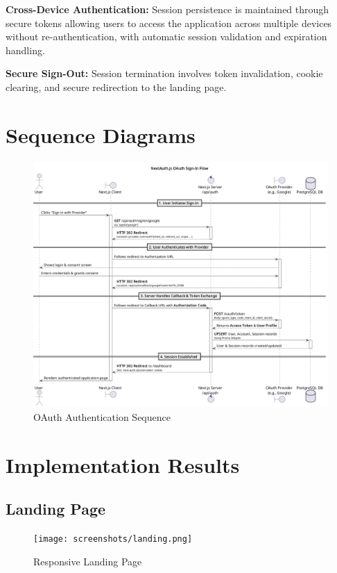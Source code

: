 \textbf{Cross-Device Authentication:}
Session persistence is maintained through secure tokens allowing users to access the application across multiple devices without re-authentication, with automatic session validation and expiration handling.

\textbf{Secure Sign-Out:}
Session termination involves token invalidation, cookie clearing, and secure redirection to the landing page.

\section{Sequence Diagrams}

\begin{figure}[H]
    \centering
    \includegraphics[width=1\textwidth]{conception/SprintII/sequence_diagrams/sequence_authentication_1_1_AuthenticateUsingGoogleAccount.png}
    \caption{OAuth Authentication Sequence}
    \label{fig:seq_google_auth}
\end{figure}


\section{Implementation Results}

\subsection{Landing Page}
\begin{figure}[H]
    \centering
    \texttt{[image: screenshots/landing.png]}
    \caption{Responsive Landing Page}
    \label{fig:landing_page}
\end{figure}

